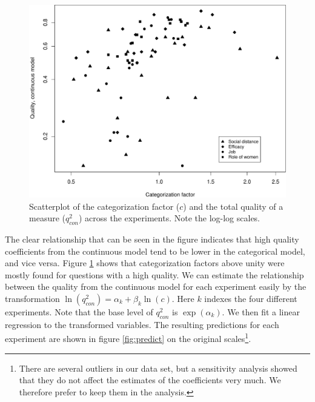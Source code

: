 \documentclass[a4paper,12pt]{article}
\begin{document}
\begin{figure}[bth] \centering
  \includegraphics[width=.75\textwidth]{i/figure-5.pdf} \caption{Scatterplot
    of the categorization factor ($c$) and the total quality of a
    measure ($q_{con}^2$) across the experiments. Note the log-log
    scales.\label{fig:meta_scatter}} \end{figure}

The clear relationship that can be seen in the figure indicates that high quality coefficients from the continuous model tend to be lower in the categorical model, and vice versa. Figure \ref{fig:meta_scatter} shows that categorization factors above unity were mostly found for questions with a high quality. We can estimate the relationship between the quality from the continuous model for each experiment easily by the transformation $\ln(q^2_{con}) = \alpha_k + \beta_k \ln(c)$. Here $k$ indexes the four different experiments. Note that the base level of $q^2_{con}$ is $\exp(\alpha_k)$.%
We then fit a linear regression to the transformed variables. The resulting predictions for each experiment are shown in figure \ref{fig:predict} on the original scales\footnote{There are several outliers in our data set, but a sensitivity analysis showed that they do not affect the estimates of the coefficients very much. We therefore prefer to keep them in the analysis.}.
\end{document}
